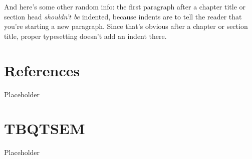 \documentclass[
11pt, %
oneside, %
english, %
singlespacing, %
]{macthesis} %
\begin{document}
And here's some other random info: the first paragraph after a chapter title or section head \emph{shouldn't be} indented, because indents are to tell the reader that you're starting a new paragraph. Since that's obvious after a chapter or section title, proper typesetting doesn't add an indent there.

\chapter*{References}\label{references}

Placeholder

\chapter{TBQTSEM}\label{tbqtsem}

Placeholder
\end{document}
